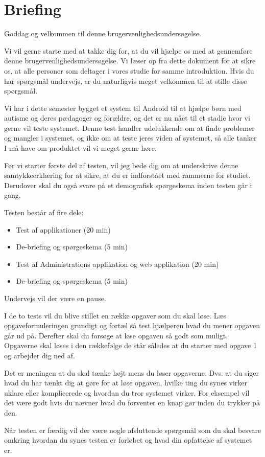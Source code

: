 \section{Briefing}
Goddag og velkommen til denne brugervenlighedsunders\o{}gelse.

Vi vil gerne starte med at takke dig for, at du vil hj\ae{}lpe os med at gennemf\o{}re denne brugervenlighedsunders\o{}gelse. Vi l\ae{}ser op fra dette dokument for at sikre os, at alle personer som deltager i vores studie for samme introduktion. Hvis du har sp\o{}rgsm\aa{}l undervejs, er du naturligvis meget velkommen til at stille disse sp\o{}rgsm\aa{}l.

Vi har i dette semester bygget et system til Android til at hj\ae{}lpe b\o{}rn med autisme og deres p\ae{}dagoger og for\ae{}ldre, og det er nu n\aa{}et til et stadie hvor vi gerne vil teste systemet. Denne test handler udelukkende om at finde problemer og mangler i systemet, og ikke om at teste jeres viden af systemet, s\aa{} alle tanker I m\aa{} have om produktet vil vi meget gerne h\o{}re.

F\o{}r vi starter f\o{}rste del af testen, vil jeg bede dig om at underskrive denne samtykkeerkl\ae{}ring for at sikre, at du er indforst\aa{}et med rammerne for studiet. Derudover skal du ogs\aa{} svare p\aa{} et demografisk sp\o{}rgeskema inden testen g\aa{}r i gang.

Testen best\aa{}r af fire dele:
\begin{itemize}
	\item Test af applikationer (20 min)
	\item De-briefing og sp\o{}rgeskema (5 min)
	\item Test af Administrations applikation og web applikation (20 min)
	\item De-briefing og sp\o{}rgeskema (5 min)
\end{itemize}

Undervejs vil der v\ae{}re en pause.

I de to tests vil du blive stillet en r\ae{}kke opgaver som du skal l\o{}se. L\ae{}s opgaveformuleringen grundigt og fort\ae{}l s\aa{} test hj\ae{}lperen hvad du mener opgaven g\aa{}r ud p\aa{}. Derefter skal du fors\o{}ge at l\o{}se opgaven s\aa{} godt som muligt. Opgaverne skal l\o{}ses i den r\ae{}kkef\o{}lge de st\aa{}r s\aa{}ledes at du starter med opgave 1 og arbejder dig ned af. 

Det er meningen at du skal t\ae{}nke h\o{}jt mens du l\o{}ser opgaverne. Dvs. at du siger hvad du har t\ae{}nkt dig at g\o{}re for at l\o{}se opgaven, hvilke ting du synes virker uklare eller komplicerede og hvordan du tror systemet virker. For eksempel vil det v\ae{}re godt hvis du n\ae{}vner hvad du forventer en knap g\o{}r inden du trykker p\aa{} den.

N\aa{}r testen er f\ae{}rdig vil der v\ae{}re nogle afsluttende sp\o{}rgsm\aa{}l som du skal besvare omkring hvordan du synes testen er forl\o{}bet og hvad din opfattelse af systemet er.